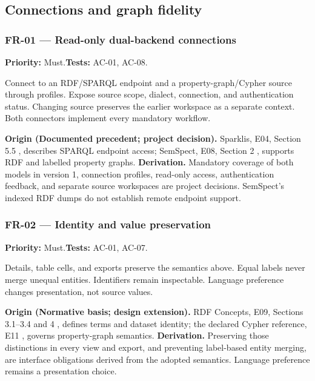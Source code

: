 \documentclass[11pt,a4paper]{article}
\newcommand{\req}[4]{\subsubsection*{#1 --- #2}\phantomsection\label{req:#1}\textbf{Priority:} #3.\quad\textbf{Tests:} #4.\par}
\newcommand{\origin}[3]{\par{\small\textbf{Origin (#1).} #2 \textbf{Derivation.} #3\par}}
\begin{document}
\subsection{Connections and graph fidelity}
\par\noindent\begin{minipage}{\linewidth}
\req{FR-01}{Read-only dual-backend connections}{Must}{AC-01, AC-08}
Connect to an RDF/SPARQL endpoint and a property-graph/Cypher source through profiles. Expose source scope, dialect, connection, and authentication status. Changing source preserves the earlier workspace as a separate context. Both connectors implement every mandatory workflow.
\origin{Documented precedent; project decision}{Sparklis, E04, Section 5.5 \citep{sparklis}, describes SPARQL endpoint access; SemSpect, E08, Section 2 \citep{semspect}, supports RDF and labelled property graphs.}{Mandatory coverage of both models in version 1, connection profiles, read-only access, authentication feedback, and separate source workspaces are project decisions. SemSpect's indexed RDF dumps do not establish remote endpoint support.}
\end{minipage}\par
\par\noindent\begin{minipage}{\linewidth}
\req{FR-02}{Identity and value preservation}{Must}{AC-01, AC-07}
Details, table cells, and exports preserve the semantics above. Equal labels never merge unequal entities. Identifiers remain inspectable. Language preference changes presentation, not source values.
\origin{Normative basis; design extension}{RDF Concepts, E09, Sections 3.1--3.4 and 4 \citep{rdfconcepts}, defines terms and dataset identity; the declared Cypher reference, E11 \citep{opencypher}, governs property-graph semantics.}{Preserving those distinctions in every view and export, and preventing label-based entity merging, are interface obligations derived from the adopted semantics. Language preference remains a presentation choice.}
\end{minipage}\par
\end{document}
